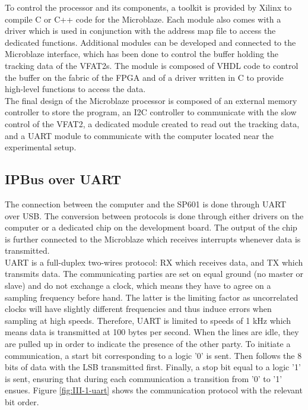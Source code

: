       To control the processor and its components, a toolkit is provided by Xilinx to compile C or C++ code for the Microblaze. Each module also comes with a driver which is used in conjunction with the address map file to access the dedicated functions. Additional modules can be developed and connected to the Microblaze interface, which has been done to control the buffer holding the tracking data of the VFAT2s. The module is composed of VHDL code to control the buffer on the fabric of the FPGA and of a driver written in C to provide high-level functions to access the data. \\

      The final design of the Microblaze processor is composed of an external memory controller to store the program, an I2C controller to communicate with the slow control of the VFAT2, a dedicated module created to read out the tracking data, and a UART module to communicate with the computer located near the experimental setup.

    \subsection{IPBus over UART}

      The connection between the computer and the SP601 is done through UART over USB. The conversion between protocols is done through either drivers on the computer or a dedicated chip on the development board. The output of the chip is further connected to the Microblaze which receives interrupts whenever data is transmitted. \\

      UART is a full-duplex two-wires protocol: RX which receives data, and TX which transmits data. The communicating parties are set on equal ground (no master or slave) and do not exchange a clock, which means they have to agree on a sampling frequency before hand. The latter is the limiting factor as uncorrelated clocks will have slightly different frequencies and thus induce errors when sampling at high speeds. Therefore, UART is limited to speeds of 1 kHz which means data is transmitted at 100 bytes per second. When the lines are idle, they are pulled up in order to indicate the presence of the other party. To initiate a communication, a start bit corresponding to a logic '0' is sent. Then follows the 8 bits of data with the LSB transmitted first. Finally, a stop bit equal to a logic '1' is sent, ensuring that during each communication a transition from '0' to '1' ensues. Figure \ref{fig:III-1-uart} shows the communication protocol with the relevant bit order. \\

